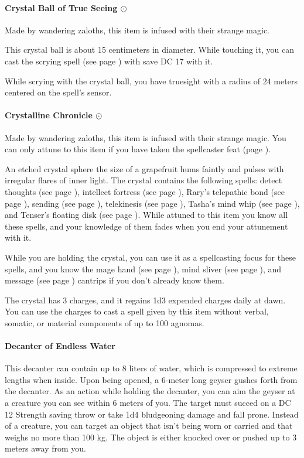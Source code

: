     \paragraph{Crystal Ball of True Seeing $\odot$}
        Made by wandering zaloths, this item is infused with their strange magic.

        This crystal ball is about 15 centimeters in diameter.
        While touching it, you can cast the scrying spell (see page \pageref{spell::scrying}) with save DC 17 with it.

        While scrying with the crystal ball, you have truesight with a radius of 24 meters centered on the spell's sensor.
    \paragraph{Crystalline Chronicle $\odot$}
        Made by wandering zaloths, this item is infused with their strange magic.
        You can only attune to this item if you have taken the spellcaster feat (page \pageref{feat::spellcaster}).

        An etched crystal sphere the size of a grapefruit hums faintly and pulses with irregular flares of inner light.
        The crystal contains the following spells: detect thoughts (see page \pageref{spell::detectthoughts}), intellect fortress (see page \pageref{spell::intellectfortress}), Rary's telepathic bond (see page \pageref{spell::rarystelepathicbond}), sending (see page \pageref{spell::sending}), telekinesis (see page \pageref{spell::telekinesis}), Tasha's mind whip (see page \pageref{spell::tashasmindwhip}), and Tenser's floating disk (see page \pageref{spell::tensersfloatingdisc}).
        While attuned to this item you know all these spells, and your knowledge of them fades when you end your attunement with it.

        While you are holding the crystal, you can use it as a spellcasting focus for these spells, and you know the mage hand (see page \pageref{spell::magehand}), mind sliver (see page \pageref{spell::mindsliver}), and message (see page \pageref{spell::message}) cantrips if you don't already know them.

        The crystal has 3 charges, and it regains 1d3 expended charges daily at dawn.
        You can use the charges to cast a spell given by this item without verbal, somatic, or material components of up to 100 agnomas.
    \paragraph{Decanter of Endless Water}
        This decanter can contain up to 8 liters of water, which is compressed to extreme lengths when inside.
        Upon being opened, a 6-meter long geyser gushes forth from the decanter.
        As an action while holding the decanter, you can aim the geyser at a creature you can see within 6 meters of you.
        The target must succed on a DC 12 Strength saving throw or take 1d4 bludgeoning damage and fall prone.
        Instead of a creature, you can target an object that isn't being worn or carried and that weighs no more than 100 kg.
        The object is either knocked over or pushed up to 3 meters away from you.

